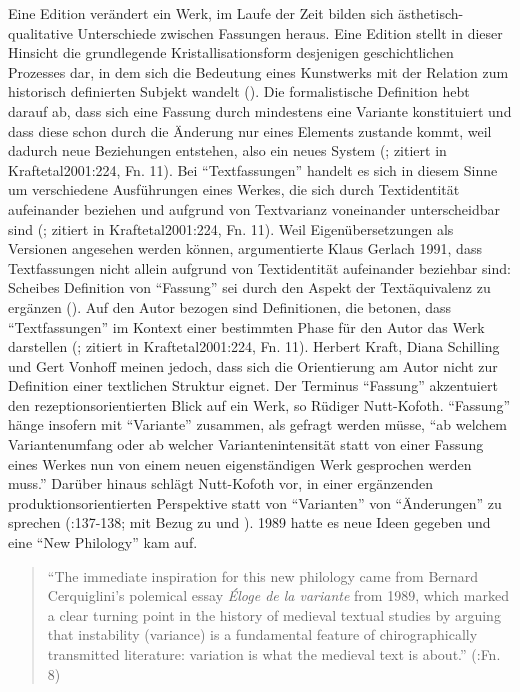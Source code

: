 \documentclass[fontsize=12pt]{scrartcl}
\begin{document}
Eine Edition ver\"andert ein Werk, im Laufe der Zeit bilden sich \"asthetisch-qualitative Unterschiede zwischen Fassungen he\-raus. Eine Edition stellt in dieser Hinsicht die grundlegende Kristallisationsform desjenigen geschichtlichen Prozesses dar, in dem sich die Bedeutung eines Kunstwerks mit der Relation zum historisch definierten Subjekt wandelt (\cite{Kraftetal2001}). Die formalistische Definition hebt darauf ab, dass sich eine Fassung durch mindestens eine Variante konstituiert und dass diese schon durch die \"Anderung nur eines Elements zustande kommt, weil dadurch neue Beziehungen entstehen, also ein neues System (\cite{Zeller1975}; zitiert in {Kraftetal2001}:224, Fn. 11). Bei "`Textfassungen"' handelt es sich in diesem Sinne um verschiedene Ausf\"uh\-rungen eines Werkes, die sich durch Textidentit\"at aufeinander beziehen und aufgrund von Textvarianz voneinander unterscheidbar sind (\cite{Scheibe1982}; zitiert in {Kraftetal2001}:224, Fn. 11). Weil Eigen\"ubersetzungen als Versionen angesehen werden k\"onnen, argumentierte Klaus Gerlach 1991, dass Textfassungen nicht allein aufgrund von Text\-identit\"at aufeinander beziehbar sind: Scheibes Definition von "`Fassung"' sei durch den Aspekt der Text\"aquivalenz zu erg\"anzen (\cite{VanHulle2005}). Auf den Autor\textsuperscript{\tiny *} bezogen sind De\-fi\-ni\-ti\-o\-nen, die betonen, dass "`Textfassungen"' im Kontext einer bestimmten Phase f\"ur den Autor\textsuperscript{\tiny *} das Werk dar\-stel\-len (\cite{Scheibe1982}; zitiert in {Kraftetal2001}:224, Fn. 11). Herbert Kraft, Diana Schilling und Gert Vonhoff meinen jedoch, dass sich die Orientierung am Autor\textsuperscript{\tiny *} nicht zur Definition einer textlichen Struktur eignet. Der Terminus "`Fassung"' akzentuiert den rezeptions\-orientierten Blick auf ein Werk, so R\"udiger Nutt-Kofoth. "`Fassung"' h\"ange insofern mit "`Variante"' zusammen, als gefragt werden m\"usse, "`ab welchem Variantenumfang oder ab wel\-cher Variantenintensit\"at statt von einer Fassung eines Werkes nun von einem neuen eigenst\"andigen Werk gesprochen werden muss."' Dar\"uber hinaus schl\"agt Nutt-Kofoth vor, in einer erg\"anzenden produktionsorientierten Perspektive statt von "`Varianten"' von "`\"Anderungen"' zu sprechen (\cite{Nutt-Kofoth2005}:137-138; mit Bezug zu \cite{ZellerSchildt1991} und \cite{Kanzog1991}). 1989 hatte es neue Ideen gegeben und eine "`New Philology"' kam auf.

\singlespacing
\begin{quote}
"`The immediate inspiration for this new philology came from Bernard Cerquiglini's polemical essay \textit{\'{E}loge de la variante} from 1989, which mark\-ed a clear turning point in the history of medieval textual studies by arguing that instability (variance) is a fundamental feature of chirographically transmitted li\-te\-ra\-ture: variation is what the medieval text is about."' (\cite{Driscoll2010}:Fn. 8)
\end{quote}
\onehalfspacing
\end{document}
